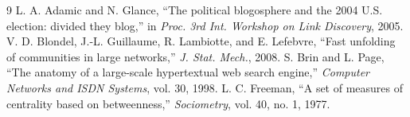 \documentclass[10pt,twocolumn]{article}
\begin{document}
\begin{thebibliography}{9}
 L. A. Adamic and N. Glance, ``The political blogosphere and the 2004 U.S.
election: divided they blog,'' in \emph{Proc. 3rd Int. Workshop on Link Discovery}, 2005.
 V. D. Blondel, J.-L. Guillaume, R. Lambiotte, and E. Lefebvre, ``Fast unfolding
of communities in large networks,'' \emph{J. Stat. Mech.}, 2008.
 S. Brin and L. Page, ``The anatomy of a large-scale hypertextual web search
engine,'' \emph{Computer Networks and ISDN Systems}, vol. 30, 1998.
 L. C. Freeman, ``A set of measures of centrality based on betweenness,''
\emph{Sociometry}, vol. 40, no. 1, 1977.
\end{thebibliography}
\end{document}
